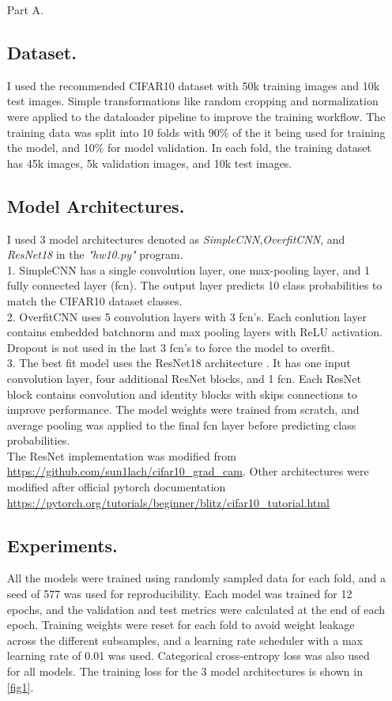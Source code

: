 \documentclass[12pt]{report}
\begin{document}
\begin{enumerate}
    \item[Part A.]
    \subsection*{Dataset.}
    I used the recommended CIFAR10 dataset with 50k training images and 10k test images. Simple transformations like random cropping and normalization were applied to the dataloader 
    pipeline to improve the training workflow. The training data was split into 10 folds with 90\% of the it being used for training the model, and 10\% for model validation. In 
    each fold, the training dataset has 45k images, 5k validation images, and 10k test images.
    \subsection*{Model Architectures.}
    I used 3 model architectures denoted as \emph{SimpleCNN},\emph{OverfitCNN}, and \emph{ResNet18} in the \emph{"hw10.py"} program.  \\
    1. SimpleCNN has a single convolution layer, one max-pooling layer, and 1 fully connected layer (fcn). The output layer predicts 10 class probabilities to match the 
    CIFAR10 dataset classes.  \\
    2. OverfitCNN uses 5 convolution layers with 3 fcn's. Each conlution layer contains embedded batchnorm and max pooling layers with ReLU activation. Dropout is not 
    used in the last 3 fcn's to force the model to overfit. \\
    3. The best fit model uses the ResNet18 architecture \cite{he2015deepresiduallearningimage}. It has one input convolution layer, four additional ResNet blocks, and 1 fcn. 
    Each ResNet block contains convolution and identity blocks with skips connections to improve performance. The model weights were trained from scratch, and average pooling 
    was applied to the final fcn layer before predicting class probabilities. \\
    The ResNet implementation was modified from \url{https://github.com/sun1lach/cifar10_grad_cam}. Other architectures were modified after official pytorch documentation 
    \url{https://pytorch.org/tutorials/beginner/blitz/cifar10_tutorial.html}
    \subsection*{Experiments.}
    All the models were trained using randomly sampled data for each fold, and a seed of 577 was used for reproducibility. Each model was trained for 12 epochs, and the 
    validation and test metrics were calculated at the end of each epoch. Training weights were reset for each fold to avoid weight leakage across the different subsamples, and 
    a learning rate scheduler with a max learning rate of 0.01 was used. Categorical cross-entropy loss was also used for all models. The training loss for the 3 model architectures 
    is shown in \autoref{fig1}.


\end{enumerate}
\end{document}
